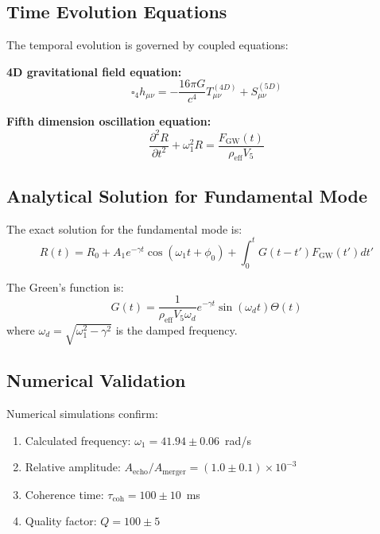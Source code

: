 \documentclass[10pt]{article}
\begin{document}
\subsection{Time Evolution Equations}

The temporal evolution is governed by coupled equations:

\textbf{4D gravitational field equation:}
\begin{equation}
\square_4 h_{\mu\nu} = -\frac{16\pi G}{c^4} T_{\mu\nu}^{(4D)} + S_{\mu\nu}^{(5D)}
\end{equation}

\textbf{Fifth dimension oscillation equation:}
\begin{equation}
\frac{\partial^2 R}{\partial t^2} + \omega_1^2 R = \frac{F_{\text{GW}}(t)}{\rho_{\text{eff}} V_5}
\end{equation}

\subsection{Analytical Solution for Fundamental Mode}

The exact solution for the fundamental mode is:
\begin{equation}
R(t) = R_0 + A_1 e^{-\gamma t} \cos(\omega_1 t + \phi_0) + \int_0^t G(t-t') F_{\text{GW}}(t') dt'
\end{equation}

The Green's function is:
\begin{equation}
G(t) = \frac{1}{\rho_{\text{eff}} V_5 \omega_d} e^{-\gamma t} \sin(\omega_d t) \Theta(t)
\end{equation}
where $\omega_d = \sqrt{\omega_1^2 - \gamma^2}$ is the damped frequency.

\subsection{Numerical Validation}

Numerical simulations confirm:
\begin{enumerate}[itemsep=0pt]
\item Calculated frequency: $\omega_1 = 41.94 \pm 0.06$~rad/s
\item Relative amplitude: $A_{\text{echo}}/A_{\text{merger}} = (1.0 \pm 0.1) \times 10^{-3}$
\item Coherence time: $\tau_{\text{coh}} = 100 \pm 10$~ms
\item Quality factor: $Q = 100 \pm 5$
\end{enumerate}
\end{document}
